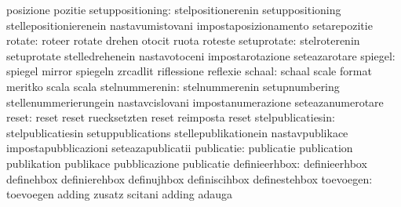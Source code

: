                                   posizione                        pozitie
                setuppositioning: stelpositionerenin               setuppositioning
                                  stellepositionierenein           nastavumistovani
                                  impostaposizionamento            setarepozitie
                          rotate: roteer                           rotate
                                  drehen                           otocit
                                  ruota                            roteste %
                     setuprotate: stelroterenin                    setuprotate
                                  stelledrehenein                  nastavotoceni
                                  impostarotazione                 seteazarotare
                         spiegel: spiegel                          mirror
                                  spiegeln                         zrcadlit
                                  riflessione                      reflexie
                          schaal: schaal                           scale
                                  format                           meritko
                                  scala                            scala %
                  stelnummerenin: stelnummerenin                   setupnumbering
                                  stellenummerierungein            nastavcislovani
                                  impostanumerazione               seteazanumerotare
                           reset: reset                            reset
                                  ruecksetzten                     reset
                                  reimposta                        reset
               stelpublicatiesin: stelpublicatiesin                setuppublications
                                  stellepublikationein             nastavpublikace
                                  impostapubblicazioni             seteazapublicatii
                      publicatie: publicatie                       publication
                                  publikation                      publikace
                                  pubblicazione                    publicatie
                   definieerhbox: definieerhbox                    definehbox
                                  definierehbox                    definujhbox
                                  definiscihbox                    definestehbox
                       toevoegen: toevoegen                        adding
                                  zusatz                           scitani
                                  adding                           adauga %
